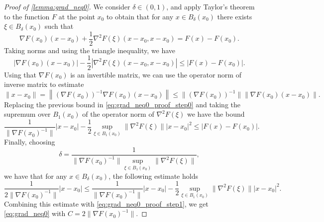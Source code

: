 \documentclass{amsart}
\begin{document}
\begin{proof}[Proof of \cref{lemma:grad_neq0}]
    We consider $\delta\in (0,1)$, and apply Taylor's theorem to the function $F$ at the point $x_0$ to obtain that for any $x\in B_\delta(x_0)$ there exists $\xi\in B_\delta(x_0)$ such that
    \begin{equation*}
        \nabla F(x_0)(x-x_0)+\frac{1}{2}\nabla^2F(\xi)(x-x_0,x-x_0)=F(x)-F(x_0).
    \end{equation*}
    Taking norms and using the triangle inequality, we have 
    \begin{equation}\label{eq:grad_neq0_proof_step0}
        \left|\nabla F(x_0)(x-x_0)\right|-\frac{1}{2}\left|\nabla^2F(\xi)(x-x_0,x-x_0)\right|\le |F(x)-F(x_0)|.
    \end{equation}
    Using that $\nabla F(x_0)$ is an invertible matrix, we can use the operator norm of inverse matrix to estimate
    \begin{equation*}
       \|x-x_0\|= \left\|(\nabla F(x_0))^{-1}\nabla F(x_0)(x-x_0)\right\|\le \|(\nabla F(x_0))^{-1}\|\|\nabla F(x_0)(x-x_0)\|.
    \end{equation*}
    Replacing the previous bound in \eqref{eq:grad_neq0_proof_step0} and taking the supremum over $B_1(x_0)$ of the operator norm of $\nabla^2F(\xi)$ we have the bound
    \begin{equation}\label{eq:grad_neq0_proof_step1}
        \frac{1}{\|\nabla F(x_0)^{-1}\|}|x-x_0|-\frac{1}{2}\sup_{\xi\in B_1(x_0)}\|\nabla^2 F(\xi)\||x-x_0|^2\le |F(x)-F(x_0)|.
    \end{equation}
    Finally, choosing 
    $$
        \delta=\frac{1}{\|\nabla F(x_0)^{-1}\|\sup_{\xi\in B_1(x_0)}\|\nabla^2 F(\xi)\|},
    $$
    we have that for any $x\in B_\delta(x_0)$, the following estimate holds
    $$
        \frac{1}{2\|\nabla F(x_0)^{-1}\|}|x-x_0|\le \frac{1}{\|\nabla F(x_0)^{-1}\|}|x-x_0|-\frac{1}{2}\sup_{\xi\in B_1(x_0)}\|\nabla^2 F(\xi)\||x-x_0|^2.
    $$
    Combining this estimate with \eqref{eq:grad_neq0_proof_step1}, we get \eqref{eq:grad_neq0} with $C=2\|\nabla F(x_0)^{-1}\|$.
\end{proof}
\end{document}
